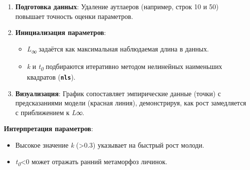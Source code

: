 \documentclass[
  letterpaper,
  DIV=11,
  numbers=noendperiod]{scrreprt}
\begin{document}
\begin{enumerate}
\def\labelenumi{\arabic{enumi}.}
\item
  \textbf{Подготовка данных}: Удаление аутлаеров (например, строк 10 и
  50) повышает точность оценки параметров.
\item
  \textbf{Инициализация параметров}:

  \begin{itemize}
  \item
    \emph{L\textsubscript{∞}} задаётся как максимальная наблюдаемая
    длина в данных.
  \item
    \emph{k} и \emph{t\textsubscript{0}} подбираются итеративно методом
    нелинейных наименьших квадратов (\textbf{\texttt{nls}}).
  \end{itemize}
\item
  \textbf{Визуализация}: График сопоставляет эмпирические данные (точки)
  с предсказаниями модели (красная линия), демонстрируя, как рост
  замедляется с приближением к \emph{L∞}.
\end{enumerate}

\textbf{Интерпретация параметров}:

\begin{itemize}
\item
  Высокое значение \emph{k} (\textgreater0.3) указывает на быстрый рост
  молоди.
\item
  \emph{t\textsubscript{0}}\textless0 может отражать ранний метаморфоз
  личинок.
\end{itemize}
\end{document}
